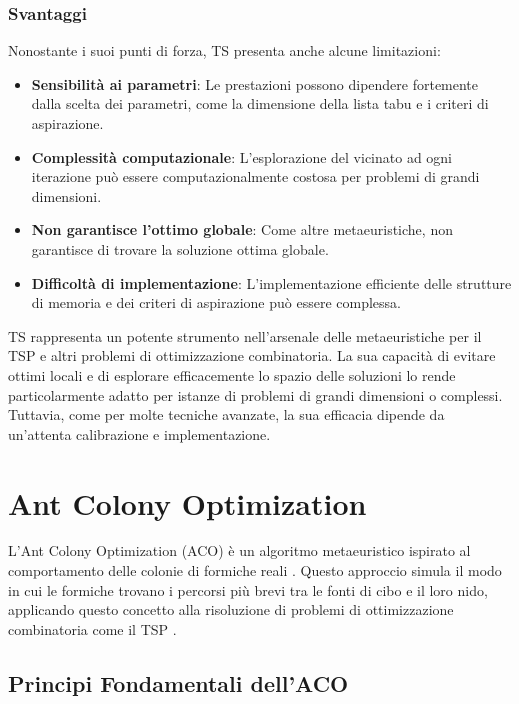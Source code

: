 \subsubsection{Svantaggi}

Nonostante i suoi punti di forza, \Gls{TS} presenta anche alcune limitazioni:

\begin{itemize}
	\item \textbf{Sensibilità ai parametri}: Le prestazioni possono dipendere fortemente dalla scelta dei parametri, come la dimensione della lista tabu e i criteri di aspirazione.
	\item \textbf{Complessità computazionale}: L'esplorazione del vicinato ad ogni iterazione può essere computazionalmente costosa per problemi di grandi dimensioni.
	\item \textbf{Non garantisce l'ottimo globale}: Come altre metaeuristiche, non garantisce di trovare la soluzione ottima globale.
	\item \textbf{Difficoltà di implementazione}: L'implementazione efficiente delle strutture di memoria e dei criteri di aspirazione può essere complessa.
\end{itemize}


\Gls{TS} rappresenta un potente strumento nell'arsenale delle metaeuristiche per il \Gls{TSP} e altri problemi di ottimizzazione combinatoria. La sua capacità di evitare ottimi locali e di esplorare efficacemente lo spazio delle soluzioni lo rende particolarmente adatto per istanze di problemi di grandi dimensioni o complessi. Tuttavia, come per molte tecniche avanzate, la sua efficacia dipende da un'attenta calibrazione e implementazione.

\section{Ant Colony Optimization}

L'Ant Colony Optimization (\Gls{ACO}) è un algoritmo metaeuristico ispirato al comportamento delle colonie di formiche reali \cite{dorigo1996ant}. Questo approccio simula il modo in cui le formiche trovano i percorsi più brevi tra le fonti di cibo e il loro nido, applicando questo concetto alla risoluzione di problemi di ottimizzazione combinatoria come il \Gls{TSP} \cite{dorigo1997ant}.

\subsection{Principi Fondamentali dell'\Gls{ACO}}

